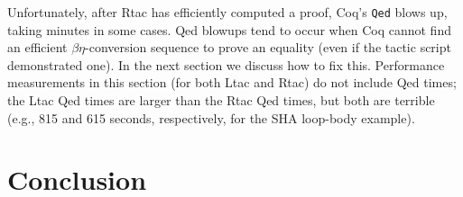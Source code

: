 \documentclass{puthesis}
\begin{document}
Unfortunately, after Rtac has efficiently computed a proof, Coq's
\lstinline|Qed| blows up, taking minutes in some cases.  Qed blowups
tend to occur when Coq cannot find an efficient $\beta\eta$-conversion
sequence to prove an equality (even if the tactic script demonstrated
one).  In the next section we discuss how to fix this.  Performance
measurements in this section (for both Ltac and Rtac) do not include
Qed times; the Ltac Qed times are larger than the Rtac Qed times, but
both are terrible (e.g., 815 and 615 seconds, respectively, for the
SHA loop-body example).


\chapter{Conclusion}



\end{document}
